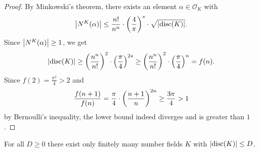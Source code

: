 \begin{proof}
By Minkowski's theorem, there exists an element
$\alpha \in \mathcal{O}_K$ with
\[
\left\lvert N^K(\alpha)\right\rvert \leq
\frac{n!}{n^n} \cdot \left(\frac{4}{\pi}\right)^s \cdot
\sqrt{\left\lvert \operatorname{disc}(K)\right\rvert}.
\]
Since $\left\lvert N^K(\alpha)\right\rvert \geq 1$, we get
\[
\left\lvert \operatorname{disc}(K)\right\rvert \geq
\left(\frac{n^n}{n!}\right)^2 \cdot \left(\frac{\pi}{4}\right)^{2s} \geq
\left(\frac{n^n}{n!}\right)^2 \cdot \left(\frac{\pi}{4}\right)^n =
f(n).
\]
Since $f(2) = \frac{\pi^2}{4} > 2$ and
\[
\frac{f(n+1)}{f(n)} =
\frac{\pi}{4} \cdot \left(\frac{n+1}{n}\right)^{2n} \geq
\frac{3 \pi}{4} >
1
\]
by Bernoulli's inequality, the lower bound indeed diverges and is
greater than $1$.
\end{proof}


\begin{izrek}[Hermite]
For all $D \geq 0$ there exist only finitely many number fields $K$
with $\left\lvert \operatorname{disc}(K)\right\rvert \leq D$.
\end{izrek}

